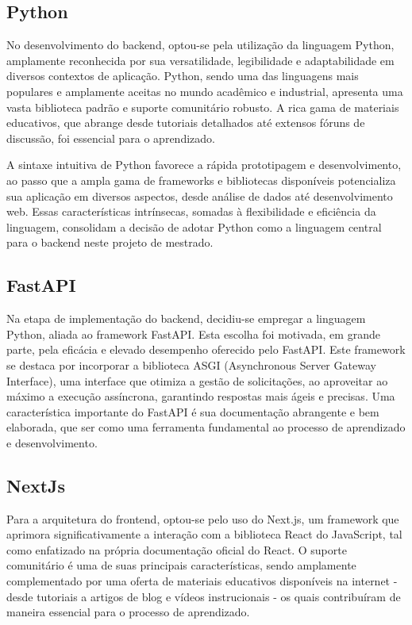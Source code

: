 \subsection{Python}
No desenvolvimento do backend, optou-se pela utilização da linguagem Python, amplamente reconhecida por sua versatilidade, legibilidade e adaptabilidade em diversos contextos de aplicação. Python, sendo uma das linguagens mais populares e amplamente aceitas no mundo acadêmico e industrial, apresenta uma vasta biblioteca padrão e suporte comunitário robusto. A rica gama de materiais educativos, que abrange desde tutoriais detalhados até extensos fóruns de discussão, foi essencial para o aprendizado.

A sintaxe intuitiva de Python favorece a rápida prototipagem e desenvolvimento, ao passo que a ampla gama de frameworks e bibliotecas disponíveis potencializa sua aplicação em diversos aspectos, desde análise de dados até desenvolvimento web. Essas características intrínsecas, somadas à flexibilidade e eficiência da linguagem, consolidam a decisão de adotar Python como a linguagem central para o backend neste projeto de mestrado.


\subsection{FastAPI}
Na etapa de implementação do backend, decidiu-se empregar a linguagem Python, aliada ao framework FastAPI. Esta escolha foi motivada, em grande parte, pela eficácia e elevado desempenho oferecido pelo FastAPI. Este framework se destaca por incorporar a biblioteca ASGI (Asynchronous Server Gateway Interface), uma interface que otimiza a gestão de solicitações, ao aproveitar ao máximo a execução assíncrona, garantindo respostas mais ágeis e precisas. Uma característica importante do FastAPI é sua documentação abrangente e bem elaborada, que ser como uma ferramenta fundamental ao processo de aprendizado e desenvolvimento.

\subsection{NextJs}
Para a arquitetura do frontend, optou-se pelo uso do Next.js, um framework que aprimora significativamente a interação com a biblioteca React do JavaScript, tal como enfatizado na própria documentação oficial do React. O suporte comunitário é uma de suas principais características, sendo amplamente complementado por uma oferta de materiais educativos disponíveis na internet - desde tutoriais a artigos de blog e vídeos instrucionais - os quais contribuíram de maneira essencial para o processo de aprendizado.

